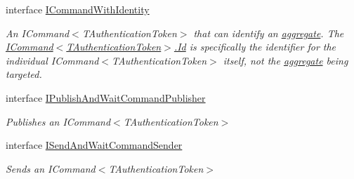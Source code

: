 \begin{DoxyCompactItemize}
interface \hyperlink{interfaceCqrs_1_1Commands_1_1ICommandWithIdentity}{I\+Command\+With\+Identity}
\begin{DoxyCompactList}\small\item\em An I\+Command$<$\+T\+Authentication\+Token$>$ that can identify an \hyperlink{}{aggregate}. The \hyperlink{interfaceCqrs_1_1Commands_1_1ICommand_a79acca2013a08295cef32f1917d97e96_a79acca2013a08295cef32f1917d97e96}{I\+Command$<$\+T\+Authentication\+Token$>$.\+Id} is specifically the identifier for the individual I\+Command$<$\+T\+Authentication\+Token$>$ itself, not the \hyperlink{}{aggregate} being targeted. \end{DoxyCompactList}\item 
interface \hyperlink{interfaceCqrs_1_1Commands_1_1IPublishAndWaitCommandPublisher}{I\+Publish\+And\+Wait\+Command\+Publisher}
\begin{DoxyCompactList}\small\item\em Publishes an I\+Command$<$\+T\+Authentication\+Token$>$ \end{DoxyCompactList}\item 
interface \hyperlink{interfaceCqrs_1_1Commands_1_1ISendAndWaitCommandSender}{I\+Send\+And\+Wait\+Command\+Sender}
\begin{DoxyCompactList}\small\item\em Sends an I\+Command$<$\+T\+Authentication\+Token$>$ \end{DoxyCompactList}\end{DoxyCompactItemize}
